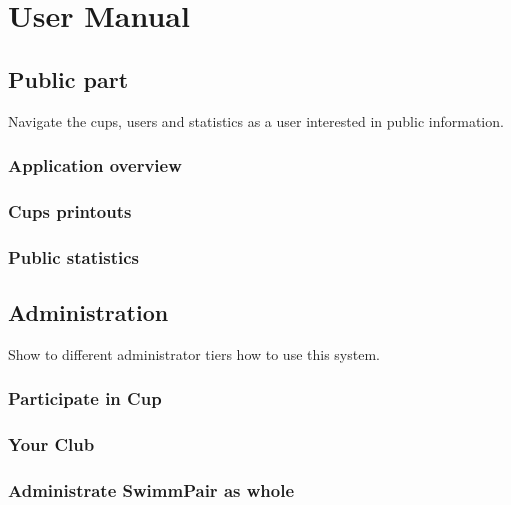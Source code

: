 \chapter{User Manual}
\section{Public part}
Navigate the cups, users and statistics as a user interested in public information.
\subsection*{Application overview}
\subsection*{Cups printouts}
\subsection*{Public statistics}

\section{Administration}
Show to different administrator tiers how to use this system.
\subsection*{Participate in Cup}
\subsection*{Your Club}
\subsection*{Administrate SwimmPair as whole}
